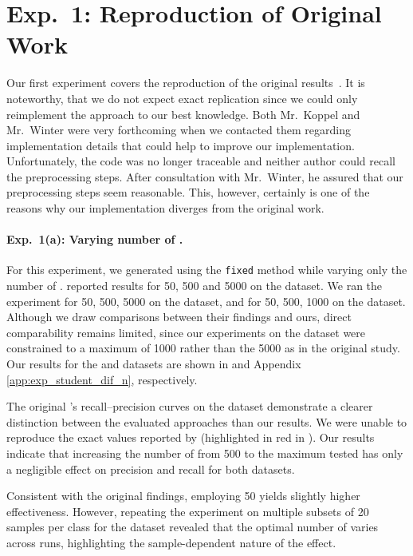
\section{Exp.\ 1: Reproduction of Original Work}
\label{sec:reproduction_res}

Our first experiment covers the reproduction of the original results~\citep{koppel_determining_2014}.
It is noteworthy, that we do not expect exact replication since we could only reimplement the approach to our best knowledge.
Both Mr.\ Koppel and Mr.\ Winter were very forthcoming when we contacted them regarding implementation details that could help to improve our implementation.
Unfortunately, the code was no longer traceable and neither author could recall the preprocessing steps.
After consultation with Mr.\ Winter, he assured that our preprocessing steps seem reasonable.
This, however, certainly is one of the reasons why our implementation diverges from the original work.

\paragraph{Exp.\ 1(a): Varying number of \imps{}.}

For this experiment, we generated \imps{} using the \texttt{fixed} method while varying only the number of \imps{}.
\citet{koppel_determining_2014} reported results for 50, 500 and 5000 \imps{} on the \dataBlog{} dataset.
We ran the experiment for 50, 500, 5000 \imps{} on the \dataStudent{} dataset, and for 50, 500, 1000 \imps{} on the \dataBlog{} dataset.
Although we draw comparisons between their findings and ours, direct comparability remains limited, since our experiments on the \dataBlog{} dataset were constrained to a maximum of \num{1000} \imps{} rather than the \num{5000} as in the original study.
Our results for the \dataBlog{} and \dataStudent{} datasets are shown in  and Appendix \ref{app:exp_student_dif_n}, respectively.

The original \impAppr{}'s recall–precision curves on the \dataBlog{} dataset demonstrate a clearer distinction between the evaluated approaches than our results.
We were unable to reproduce the exact values reported by \citet{koppel_determining_2014} (highlighted in red in ). 
Our results indicate that increasing the number of \imps{} from 500 to the maximum tested has only a negligible effect on precision and recall for both datasets.

Consistent with the original findings, employing 50 \imps{} yields slightly higher effectiveness. 
However, repeating the experiment on multiple subsets of 20 samples per class for the \dataBlog{} dataset revealed that the optimal number of \imps{} varies across runs, highlighting the sample-dependent nature of the effect.

